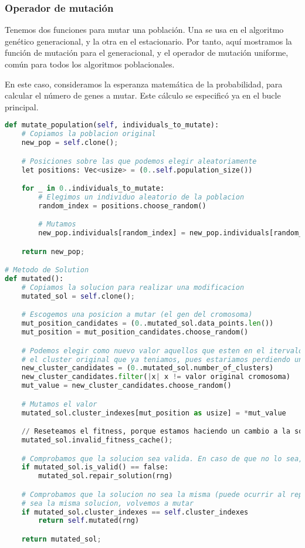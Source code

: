 \documentclass[11pt]{article}
\begin{document}
\subsubsection{Operador de mutación}

Tenemos dos funciones para mutar una población. Una se usa en el algoritmo genético generacional, y la otra en el estacionario. Por tanto, aquí mostramos la función de mutación para el generacional, y el operador de mutación uniforme, común para todos los algoritmos poblacionales.

En este caso, consideramos la esperanza matemática de la probabilidad, para calcular el número de genes a mutar. Este cálculo se especificó ya en el bucle principal.

\begin{lstlisting}[language=Python, style=Boxed]
def mutate_population(self, individuals_to_mutate):
    # Copiamos la poblacion original
    new_pop = self.clone();

    # Posiciones sobre las que podemos elegir aleatoriamente
    let positions: Vec<usize> = (0..self.population_size())

    for _ in 0..individuals_to_mutate:
        # Elegimos un individuo aleatorio de la poblacion
        random_index = positions.choose_random()

        # Mutamos
        new_pop.individuals[random_index] = new_pop.individuals[random_index].mutated()

    return new_pop;

# Metodo de Solution
def mutated():
    # Copiamos la solucion para realizar una modificacion
    mutated_sol = self.clone();

    # Escogemos una posicion a mutar (el gen del cromosoma)
    mut_position_candidates = (0..mutated_sol.data_points.len())
    mut_position = mut_position_candidates.choose_random()

    # Podemos elegir como nuevo valor aquellos que esten en el itervalo adecuado y que no sean
    # el cluster original que ya teniamos, pues estariamos perdiendo una mutacion efectiva
    new_cluster_candidates = (0..mutated_sol.number_of_clusters)
    new_cluster_candidates.filter(|x| x != valor original cromosoma)
    mut_value = new_cluster_candidates.choose_random()

    # Mutamos el valor
    mutated_sol.cluster_indexes[mut_position as usize] = *mut_value

    // Reseteamos el fitness, porque estamos haciendo un cambio a la solucion que devolvemos
    mutated_sol.invalid_fitness_cache();

    # Comprobamos que la solucion sea valida. En caso de que no lo sea, la reparamos
    if mutated_sol.is_valid() == false:
        mutated_sol.repair_solution(rng)

    # Comprobamos que la solucion no sea la misma (puede ocurrir al reparar). En caso de que
    # sea la misma solucion, volvemos a mutar
    if mutated_sol.cluster_indexes == self.cluster_indexes
        return self.mutated(rng)

    return mutated_sol;

\end{lstlisting}
\end{document}
